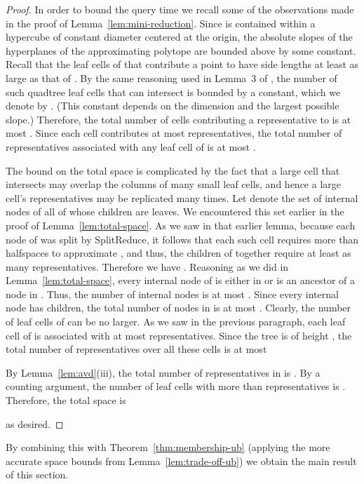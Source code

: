 \documentclass[11pt]{article}   \usepackage[letterpaper,hmargin=2.1cm,vmargin=3cm]{geometry}
\newcommand{\alg}{\textrm{SplitReduce}}
\begin{document}
\begin{proof}
In order to bound the query time we recall some of the observations made in the proof of Lemma~\ref{lem:mini-reduction}. Since  is contained within a hypercube of constant diameter centered at the origin, the absolute slopes of the hyperplanes of the approximating polytope are bounded above by some constant. Recall that the leaf cells of  that contribute a point to  have side lengths at least as large as that of . By the same reasoning used in Lemma~{3} of \cite{ARS}, the number of such quadtree leaf cells that can intersect  is bounded by a constant, which we denote by . (This constant depends on the dimension  and the largest possible slope.) Therefore, the total number of cells contributing a representative to  is at most . Since each cell contributes at most  representatives, the total number of representatives associated with any leaf cell of  is at most .

The bound on the total space is complicated by the fact that a large cell that intersects  may overlap the columns of many small leaf cells, and hence a large cell's representatives may be replicated many times. Let  denote the set of internal nodes of  all of whose children are leaves. We encountered this set earlier in the proof of Lemma~\ref{lem:total-space}. As we saw in that earlier lemma, because each node of  was split by {\alg}, it follows that each such cell requires more than  halfspaces to approximate , and thus, the children of  together require at least as many representatives. Therefore we have . Reasoning as we did in Lemma~\ref{lem:total-space}, every internal node of  is either in  or is an ancestor of a node in . Thus, the number of internal nodes is at most . Since every internal node has  children, the total number of nodes in  is at most . Clearly, the number of leaf cells of  can be no larger. As we saw in the previous paragraph, each leaf cell of  is associated with at most  representatives. Since the tree is of height , the total number of representatives over all these cells is at most

By Lemma~\ref{lem:avd}(iii), the total number of representatives in  is . By a counting argument, the number of leaf cells with more than  representatives is . Therefore, the total space is

as desired.
\end{proof}


By combining this with Theorem~\ref{thm:membership-ub} (applying the more accurate space bounds from Lemma~\ref{lem:trade-off-ub}) we obtain the main result of this section.
\end{document}
